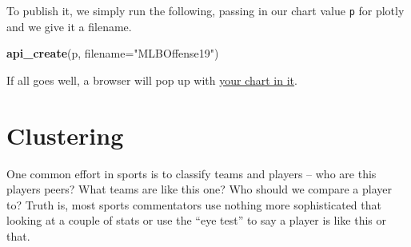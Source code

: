 \documentclass[]{book}
\newenvironment{Shaded}{\begin{snugshade}}{\end{snugshade}}
\newcommand{\DataTypeTok}[1]{\textcolor[rgb]{0.13,0.29,0.53}{#1}}
\newcommand{\KeywordTok}[1]{\textcolor[rgb]{0.13,0.29,0.53}{\textbf{#1}}}
\newcommand{\NormalTok}[1]{#1}
\newcommand{\OperatorTok}[1]{\textcolor[rgb]{0.81,0.36,0.00}{\textbf{#1}}}
\newcommand{\StringTok}[1]{\textcolor[rgb]{0.31,0.60,0.02}{#1}}
\begin{document}
\begin{Shaded}
\end{Shaded}

To publish it, we simply run the following, passing in our chart value \texttt{p} for plotly and we give it a filename.

\begin{Shaded}
\begin{Highlighting}[]
\KeywordTok{api_create}\NormalTok{(p, }\DataTypeTok{filename=}\StringTok{"MLBOffense19"}\NormalTok{)}
\end{Highlighting}
\end{Shaded}

If all goes well, a browser will pop up with \href{https://plot.ly/~mattwaite/1/\#/}{your chart in it}.

\hypertarget{clustering}{%
\chapter{Clustering}\label{clustering}}

One common effort in sports is to classify teams and players -- who are this players peers? What teams are like this one? Who should we compare a player to? Truth is, most sports commentators use nothing more sophisticated that looking at a couple of stats or use the ``eye test'' to say a player is like this or that.
\end{document}
